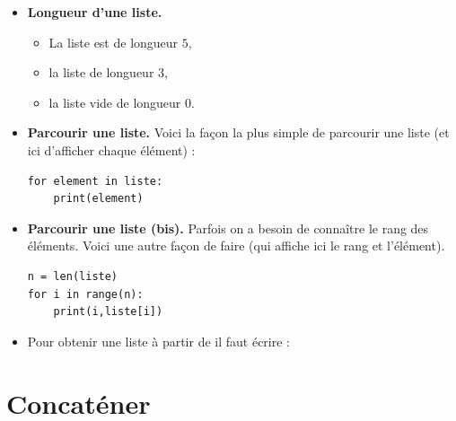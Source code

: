 \documentclass[12pt,class=report,crop=false]{standalone}
\begin{document}
\begin{itemize}
  \item \textbf{Longueur d'une liste.}  
  
  \begin{itemize}
  \item La liste \ci{[5,4,3,2,1]} est de longueur $5$, 
  \item la liste  de longueur $3$, 
  \item la liste vide \ci{[]} de longueur $0$.
  \end{itemize}
  
   \bigskip

  
  \item \textbf{Parcourir une liste.} 
	Voici la façon la plus simple de parcourir une liste (et ici d'afficher chaque élément) :
\begin{lstlisting}
for element in liste:
    print(element)
\end{lstlisting}

  \bigskip 
  
  \item \textbf{Parcourir une liste (bis).} 
  Parfois on a besoin de connaître le rang des éléments. Voici une autre façon de faire (qui affiche ici le rang et l'élément).
\begin{lstlisting}
n = len(liste)
for i in range(n):
    print(i,liste[i])
\end{lstlisting}  

  \bigskip 
  
\item Pour obtenir une liste à partir de  il faut écrire :\\
\centerline{}
\end{itemize}


\newpage


\section*{Concaténer}
\end{document}
